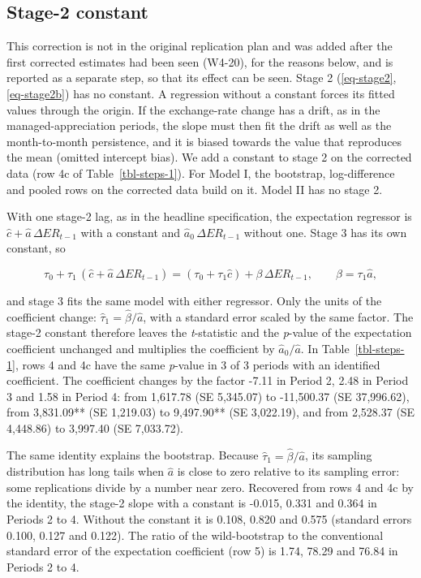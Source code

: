 \documentclass[
  12pt,
  a4paper,
]{article}
\begin{document}
\subsection{Stage-2 constant}\label{sec-stage2-const}

This correction is not in the original replication plan and was added
after the first corrected estimates had been seen (W4-20), for the
reasons below, and is reported as a separate step, so that its effect
can be seen. Stage 2 (\ref{eq-stage2}, \ref{eq-stage2b}) has no
constant. A regression without a constant forces its fitted values
through the origin. If the exchange-rate change has a drift, as in the
managed-appreciation periods, the slope must then fit the drift as well
as the month-to-month persistence, and it is biased towards the value
that reproduces the mean (omitted intercept bias). We add a constant to
stage 2 on the corrected data (row 4c of Table~\ref{tbl-steps-1}). For
Model I, the bootstrap, log-difference and pooled rows on the corrected
data build on it. Model II has no stage 2.

With one stage-2 lag, as in the headline specification, the expectation
regressor is \(\hat c + \hat a\,\Delta ER_{t-1}\) with a constant and
\(\hat a_0\,\Delta ER_{t-1}\) without one. Stage 3 has its own constant,
so

\[
\tau_0 + \tau_1\,(\hat c + \hat a\,\Delta ER_{t-1}) = (\tau_0 + \tau_1 \hat c) + \beta\,\Delta ER_{t-1}, \qquad \beta = \tau_1 \hat a ,
\]

and stage 3 fits the same model with either regressor. Only the units of
the coefficient change: \(\hat\tau_1=\hat\beta/\hat a\), with a standard
error scaled by the same factor. The stage-2 constant therefore leaves
the \emph{t}-statistic and the \emph{p}-value of the expectation
coefficient unchanged and multiplies the coefficient by
\(\hat a_0/\hat a\). In Table~\ref{tbl-steps-1}, rows 4 and 4c have the
same \emph{p}-value in 3 of 3 periods with an identified coefficient.
The coefficient changes by the factor -7.11 in Period 2, 2.48 in Period
3 and 1.58 in Period 4: from 1,617.78 (SE 5,345.07) to -11,500.37 (SE
37,996.62), from 3,831.09** (SE 1,219.03) to 9,497.90** (SE 3,022.19),
and from 2,528.37 (SE 4,448.86) to 3,997.40 (SE 7,033.72).

The same identity explains the bootstrap. Because
\(\hat\tau_1 = \hat\beta/\hat a\), its sampling distribution has long
tails when \(\hat a\) is close to zero relative to its sampling error:
some replications divide by a number near zero. Recovered from rows 4
and 4c by the identity, the stage-2 slope with a constant is -0.015,
0.331 and 0.364 in Periods 2 to 4. Without the constant it is 0.108,
0.820 and 0.575 (standard errors 0.100, 0.127 and 0.122). The ratio of
the wild-bootstrap to the conventional standard error of the expectation
coefficient (row 5) is 1.74, 78.29 and 76.84 in Periods 2 to 4.
\end{document}
